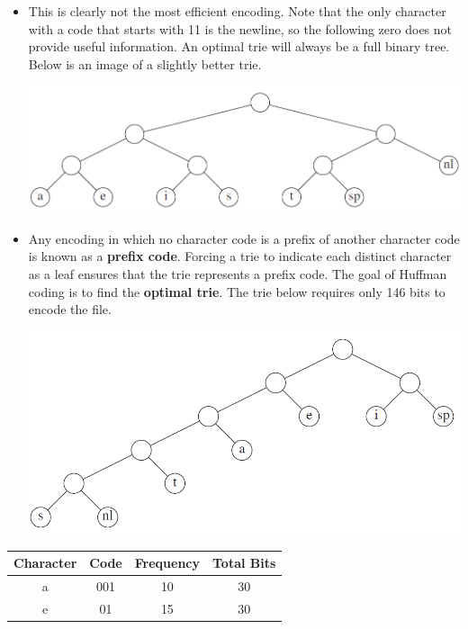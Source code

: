 \documentclass{article}
\begin{document}
\begin{itemize}
\begin{itemize}
\begin{center}
        \end{center}
        \item This is clearly not the most efficient encoding. Note that the only character with a code that starts with 11 is the newline, so the following zero does not provide useful information. An optimal trie will always be a full binary tree. Below is an image of a slightly better trie.
        \begin{center}
        \includegraphics[scale=0.5]{trie2}
        \end{center}
        \item Any encoding in which no character code is a prefix of another character code is known as a \textbf{prefix code}. Forcing a trie to indicate each distinct character as a leaf ensures that the trie represents a prefix code. The goal of Huffman coding is to find the \textbf{optimal trie}. The trie below requires only 146 bits to encode the file.
        \begin{center}
        \includegraphics[scale=0.5]{trie3}
        \end{center}
    \end{itemize}
    \begin{center}
    \begin{tabular}{|c c c c|}
    \hline
    Character & Code & Frequency & Total Bits \\ [0.5ex]
    \hline\hline
    a & 001 & 10 & 30 \\
    e & 01 & 15 & 30 \\

\end{tabular}
\end{center}
\end{itemize}
\end{document}
